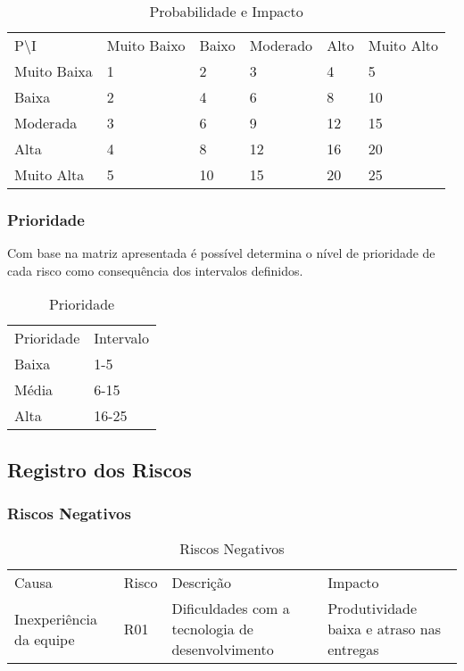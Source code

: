 \begin{table}[htp]
\centering
\caption{Probabilidade e Impacto}
\label{probabilidade-impacto}
\begin{tabular}{llllll}
P\textbackslash I         & Muito Baixo & Baixo & Moderado & Alto & Muito Alto \\
Muito Baixa & 1           & 2     & 3        & 4    & 5          \\
Baixa       & 2           & 4     & 6        & 8    & 10         \\
Moderada    & 3           & 6     & 9        & 12   & 15         \\
Alta        & 4           & 8     & 12       & 16   & 20         \\
Muito Alta  & 5           & 10    & 15       & 20   & 25        
\end{tabular}
\end{table}

\subsubsection{Prioridade}
Com base na matriz apresentada é possível determina o nível de prioridade de cada risco como consequência dos intervalos definidos.

\begin{table}[htp]
\centering
\caption{Prioridade}
\label{prioridade}
\begin{tabular}{ll}
Prioridade & Intervalo \\
Baixa      & 1-5       \\
Média      & 6-15      \\
Alta       & 16-25    
\end{tabular}
\end{table}

\subsection{Registro dos Riscos}

\subsubsection{Riscos Negativos}

\begin{table}[htp]
\centering
\caption{Riscos Negativos}
\label{riscos-negativos}
\begin{tabular}{llll}
Causa                   & Risco & Descrição                                        & Impacto                                   \\
Inexperiência da equipe & R01   & Dificuldades com a tecnologia de desenvolvimento & Produtividade baixa e atraso nas entregas
\end{tabular}
\end{table}

